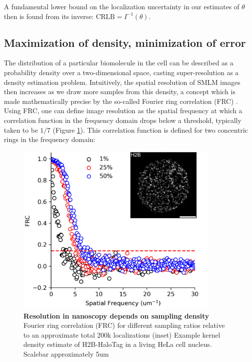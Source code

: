 A fundamental lower bound on the localization uncertainty in our estimates of $\theta$ then is found from its inverse: $\mathrm{CRLB} = I^{-1}(\theta)$.

\subsection{Maximization of density, minimization of error}

The distribution of a particular biomolecule in the cell can be described as a probability density over a two-dimensional space, casting super-resolution as a density estimation problem. Intuitively, the spatial resolution of SMLM images then increases as we draw more samples from this density, a concept which is made mathematically precise by the so-called Fourier ring correlation (FRC) \parencite{Nieuwenhuizen2013}. Using FRC, one can define image resolution as the spatial frequency at which a correlation function in the frequency domain drops below a threshold, typically taken to be $1/7$  (Figure \ref{fig:fig3}). This correlation function is defined for two concentric rings in the frequency domain:

\begin{figure}[t]
\begin{center}
\includegraphics[width=10cm]{media/FRC.png}
\end{center}
\caption{\textbf{Resolution in nanoscopy depends on sampling density} Fourier ring correlation (FRC) for different sampling ratios relative to an approximate total 200k localizations (inset) Example kernel density estimate of H2B-HaloTag in a living HeLa cell nucleus. Scalebar approximately 5um}
\label{fig:fig3}
\end{figure}

